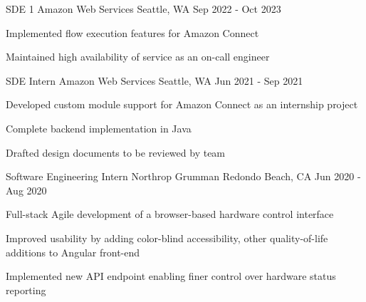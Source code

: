 
\begin{cventries}
	\cventry
	{SDE 1}
	{Amazon Web Services}
	{Seattle, WA}
	{Sep 2022 - Oct 2023}
	{
		\begin{cvitems}
			\item{Implemented flow execution features for Amazon Connect}
			\item{Maintained high availability of service as an on-call engineer}
		\end{cvitems}
	}
	\cventry
	{SDE Intern}
	{Amazon Web Services}
	{Seattle, WA}
	{Jun 2021 - Sep 2021}
	{
		\begin{cvitems}
			\item{Developed custom module support for Amazon Connect as an internship project}
			\item{Complete backend implementation in Java}
			\item{Drafted design documents to be reviewed by team}
		\end{cvitems}
	}
	\cventry
	{Software Engineering Intern}
	{Northrop Grumman}
	{Redondo Beach, CA}
	{Jun 2020 - Aug 2020}
	{
		\begin{cvitems}
			\item{Full-stack Agile development of a browser-based hardware control interface}
			\item{Improved usability by adding color-blind accessibility, other quality-of-life additions to Angular front-end}
			\item{Implemented new API endpoint enabling finer control over hardware status reporting}
		\end{cvitems}
	}
\end{cventries}
